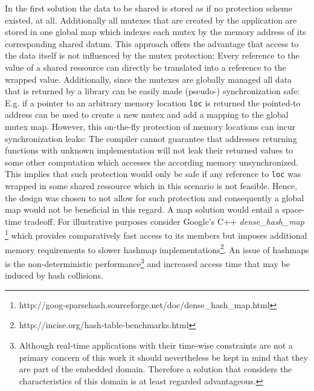 In the first solution the data to be shared is stored as if no protection scheme existed, at all. Additionally all mutexes that are created by the application are stored in one global map which indexes each mutex by the memory address of its corresponding shared datum. This approach offers the advantage that access to the data itself is not influenced by the mutex protection: Every reference to the value of a shared ressource  can directly be translated into a reference to the wrapped value. Additionally, since the mutexes are globally managed all data that is returned by a library can be easily made (pseudo-) synchronization safe: E.g. if a pointer to an arbitrary memory location \texttt{loc} is returned the pointed-to address can be used to create a new mutex and add a mapping to the global mutex map. However, this on-the-fly protection of memory locations can incur synchronization leaks: The compiler cannot guarantee that addresses returning functions with unknown implementation will not leak their returned values to some other computation which accesses the according memory unsynchronized. This implies that such protection would only be safe if any reference to \texttt{loc} was wrapped in some shared ressource which in this scenario is not feasible. Hence, the design was chosen to not allow for such protection and consequently a global map would not be beneficial in this regard. A map solution would entail a space-time tradeoff. For illustrative purposes consider Google's C++ \textit{dense\_hash\_map} \footnote{http://goog-sparsehash.sourceforge.net/doc/dense\_hash\_map.html} which provides comparatively fast access to its members but imposes additional memory requirements to slower hashmap implementations\footnote{http://incise.org/hash-table-benchmarks.html}. An issue of hashmaps is the non-deterministic performance\footnote{Although real-time applications with their time-wise constraints are not a primary concern of this work it should nevertheless be kept in mind that they are part of the embedded domain. Therefore a solution that considers the characteristics of this domain is at least regarded advantageous.} and increased access time that may be induced by hash collisions\cite{FastAndDeterministicHashTable}.

